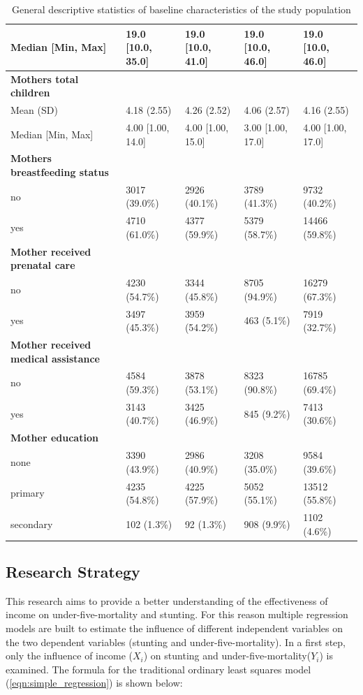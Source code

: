 \documentclass[a4paper, 11pt]{article} %
\begin{document}
\begin{table}[!htbp]
{{\begin{tabular}{lllll}
    Median [Min, Max] &	19.0 [10.0, 35.0] & 19.0 [10.0, 41.0] &	19.0 [10.0, 46.0] &	19.0 [10.0, 46.0] \\ \hline
    \textbf{Mothers total children} & & & &  \\						
    Mean (SD) &	4.18 (2.55) &	4.26 (2.52) &	4.06 (2.57) & 4.16 (2.55) \\
    Median [Min, Max] &	4.00 [1.00, 14.0] & 4.00 [1.00, 15.0] &	3.00 [1.00, 17.0] &	4.00 [1.00, 17.0] \\ \hline
    \textbf{Mothers breastfeeding status} & & & &  \\						
    no &	3017 (39.0\%) &	2926 (40.1\%) &	3789 (41.3\%) & 9732 (40.2\%) \\
    yes &	4710 (61.0\%) &	4377 (59.9\%) &	5379 (58.7\%) & 14466 (59.8\%) \\ \hline
    \textbf{Mother received prenatal care} & & & &  \\						
    no &	4230 (54.7\%) &	3344 (45.8\%) &	8705 (94.9\%) & 16279 (67.3\%) \\
    yes &	3497 (45.3\%) &	3959 (54.2\%) &	463 (5.1\%) & 7919 (32.7\%) \\ \hline
    \textbf{Mother received medical assistance} & & & &  \\						
    no	& 4584 (59.3\%) &	3878 (53.1\%) &	8323 (90.8\%) &	16785 (69.4\%) \\
    yes	& 3143 (40.7\%) &	3425 (46.9\%) &	845 (9.2\%) &	7413 (30.6\%) \\ \hline
    \textbf{Mother education} & & & &  \\						
    none &	3390 (43.9\%) &	2986 (40.9\%) &	3208 (35.0\%) & 9584 (39.6\%) \\
    primary &	4235 (54.8\%) &	4225 (57.9\%) &	5052 (55.1\%) & 13512 (55.8\%) \\
    secondary &	102 (1.3\%) &	92 (1.3\%) &	908 (9.9\%) & 1102 (4.6\%) \\ \hline
    \end{tabular}
  }}
  \caption{General descriptive statistics of baseline characteristics of the study population}
  \label{table:descriptive_gen}
\end{table}

\subsection*{Research Strategy}

This research aims to provide a better understanding of the effectiveness of income on under-five-mortality and stunting. For this reason multiple regression models are built to estimate the influence of different independent variables on the two dependent variables (stunting and under-five-mortality). In a first step, only the influence of income ($X_i$) on stunting and under-five-mortality($Y_i$) is examined. The formula for the traditional ordinary least squares model (\ref{eqn:simple_regression}) is shown below:
\end{document}
